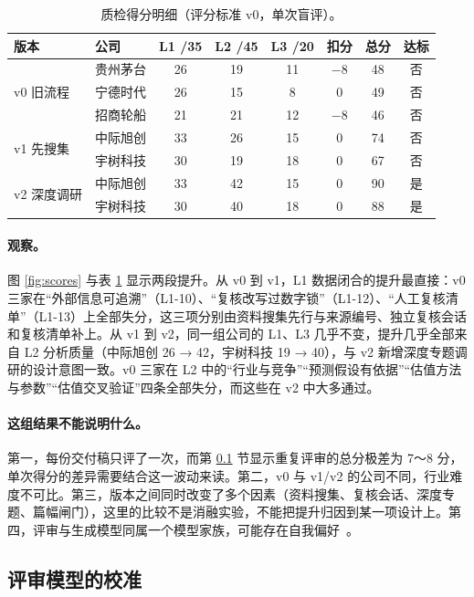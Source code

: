 \begin{table}[t]
\centering
\caption{质检得分明细（评分标准 v0，单次盲评）。}
\label{tab:scores}
\small
\begin{tabular}{@{}llccccc c@{}}
\toprule
版本 & 公司 & L1 /35 & L2 /45 & L3 /20 & 扣分 & 总分 & 达标 \\
\midrule
\multirow{3}{*}{v0 旧流程} & 贵州茅台 & 26 & 19 & 11 & $-8$ & 48 & 否 \\
 & 宁德时代 & 26 & 15 & 8 & 0 & 49 & 否 \\
 & 招商轮船 & 21 & 21 & 12 & $-8$ & 46 & 否 \\
\midrule
\multirow{2}{*}{v1 先搜集} & 中际旭创 & 33 & 26 & 15 & 0 & 74 & 否 \\
 & 宇树科技 & 30 & 19 & 18 & 0 & 67 & 否 \\
\midrule
\multirow{2}{*}{v2 深度调研} & 中际旭创 & 33 & 42 & 15 & 0 & 90 & 是 \\
 & 宇树科技 & 30 & 40 & 18 & 0 & 88 & 是 \\
\bottomrule
\end{tabular}
\end{table}

\paragraph{观察。}图 \ref{fig:scores} 与表 \ref{tab:scores} 显示两段提升。从 v0 到 v1，L1 数据闭合的提升最直接：v0 三家在“外部信息可追溯”（L1-10）、“复核改写过数字锁”（L1-12）、“人工复核清单”（L1-13）上全部失分，这三项分别由资料搜集先行与来源编号、独立复核会话和复核清单补上。从 v1 到 v2，同一组公司的 L1、L3 几乎不变，提升几乎全部来自 L2 分析质量（中际旭创 26 → 42，宇树科技 19 → 40），与 v2 新增深度专题调研的设计意图一致。v0 三家在 L2 中的“行业与竞争”“预测假设有依据”“估值方法与参数”“估值交叉验证”四条全部失分，而这些在 v2 中大多通过。

\paragraph{这组结果不能说明什么。}第一，每份交付稿只评了一次，而第 \ref{sec:exp-calib} 节显示重复评审的总分极差为 7～8 分，单次得分的差异需要结合这一波动来读。第二，v0 与 v1/v2 的公司不同，行业难度不可比。第三，版本之间同时改变了多个因素（资料搜集、复核会话、深度专题、篇幅闸门），这里的比较不是消融实验，不能把提升归因到某一项设计上。第四，评审与生成模型同属一个模型家族，可能存在自我偏好~\citep{panickssery2024self}。

\subsection{评审模型的校准}
\label{sec:exp-calib}

